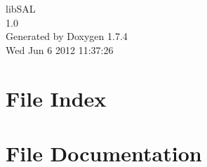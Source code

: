 \documentclass[a4paper]{book}
\begin{document}
\begin{titlepage}
\vspace*{7cm}
\begin{center}
{\Large libSAL \\[1ex]\large 1.0 }\\
\vspace*{1cm}
{\large Generated by Doxygen 1.7.4}\\
\vspace*{0.5cm}
{\small Wed Jun 6 2012 11:37:26}\\
\end{center}
\end{titlepage}
\clearemptydoublepage
{}
\tableofcontents
\clearemptydoublepage
{}
\chapter{File Index}

\chapter{File Documentation}





\printindex
\end{document}
